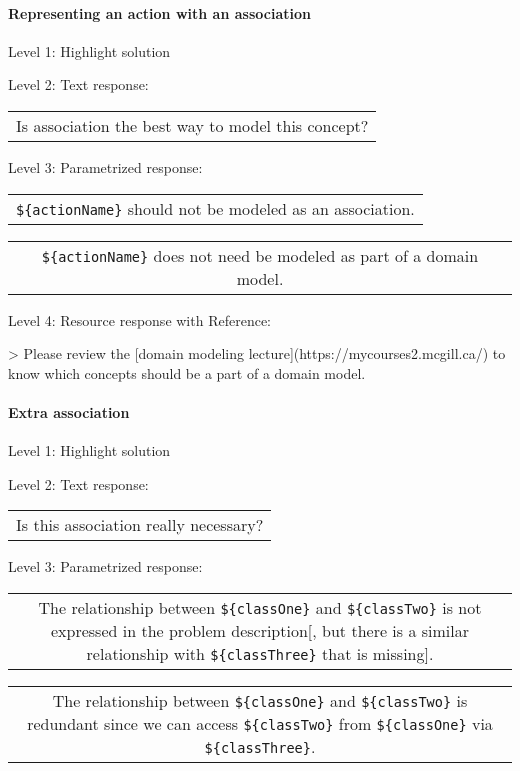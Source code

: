 \paragraph{Representing an action with an association}

\noindent Level 1: Highlight solution \medskip

\noindent Level 2: Text response: \medskip

\begin{tabular}{|c}
Is association the best way to model this concept?
\end{tabular} \medskip

\noindent Level 3: Parametrized response: \medskip

\begin{tabular}{|c}
\verb|${actionName}| should not be modeled as an association.
\end{tabular} \medskip

\begin{tabular}{|c}
\verb|${actionName}| does not need be modeled as part of a domain model.
\end{tabular} \medskip

\noindent Level 4: Resource response with Reference:

> Please review the [domain modeling lecture](https://mycourses2.mcgill.ca/) to know which concepts should be a part of a domain model.


\paragraph{Extra association}

\noindent Level 1: Highlight solution \medskip

\noindent Level 2: Text response: \medskip

\begin{tabular}{|c}
Is this association really necessary?
\end{tabular} \medskip

\noindent Level 3: Parametrized response: \medskip

\begin{tabular}{|c}
The relationship between \verb|${classOne}| and \verb|${classTwo}| is not expressed in the problem description[, but there is a similar relationship with \verb|${classThree}| that is missing].
\end{tabular} \medskip

\begin{tabular}{|c}
The relationship between \verb|${classOne}| and \verb|${classTwo}| is redundant since we can access \verb|${classTwo}| from \verb|${classOne}| via \verb|${classThree}|.
\end{tabular} \medskip

